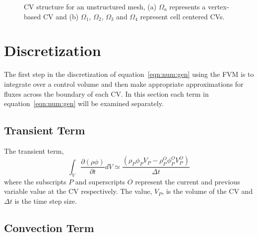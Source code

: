 \begin{figure}
\begin{center}
 \caption{CV structure for an unstructured mesh, (a) $\Omega_a$
 represents a vertex-based CV and (b) $\Omega_1$, $\Omega_2$,
 $\Omega_3$ and $\Omega_4$ represent cell centered CVs. }
 \label{fig:vc-cc-fv}
\end{center}
\end{figure}

\section{Discretization}

The first step in the discretization of equation~\eqref{eqn:num:gen}
using the FVM is to integrate over a control volume and then make
appropriate approximations for fluxes across the boundary of each CV.
In this section each term in equation~\eqref{eqn:num:gen} will be
examined separately.

\subsection{Transient Term}

The transient term,
\begin{equation}
\int_V \frac{\partial (\rho \phi)}{\partial t} dV
\simeq
\frac{(\rho_{P} \phi_{P} V_P- \rho_P^O \phi_P^O V_P^O)}{\Delta t}
\label{eqn:num:tra}
\end{equation}
where the subscripts $P$ and superscripts $O$ represent the current
and previous variable value at the CV respectively.
The value, $V_P$, is the volume of
the CV and $\Delta t$ is the time step size.

\subsection{Convection Term}

